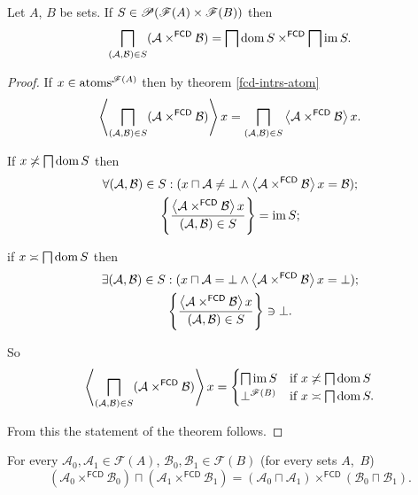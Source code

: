 \begin{thm}
\label{meet-prod-fcd}Let $A$, $B$ be sets. If
$S\in\mathscr{P}(\mathscr{F}(A)\times\mathscr{F}(B))$
then
\[
\bigsqcap_{(\mathcal{A},\mathcal{B})\in
S}(\mathcal{A}\times^{\mathsf{FCD}}\mathcal{B})=\bigsqcap\operatorname{dom}
S\times^{\mathsf{FCD}}\bigsqcap\operatorname{im} S.
\]
\end{thm}
\begin{proof}
If $x\in\operatorname{atoms}^{\mathscr{F}(A)}$ then by theorem \ref{fcd-intrs-atom}
\[
\left\langle \bigsqcap_{(\mathcal{A},\mathcal{B})\in
S}(\mathcal{A}\times^{\mathsf{FCD}}\mathcal{B})\right\rangle x=\bigsqcap_{(\mathcal{A}
,\mathcal{B})\in S}\left\langle \mathcal{A}\times^{\mathsf{FCD}}\mathcal{B}\right\rangle x.
\]


If $x\not\asymp\bigsqcap\operatorname{dom} S$ then
\begin{gather*}
\forall(\mathcal{A},\mathcal{B})\in
S:(x\sqcap\mathcal{A}\ne\bot\land\left\langle \mathcal{A}\times^{
\mathsf{FCD}}\mathcal{B}\right\rangle x=\mathcal{B});\\
\left\{ \frac{\left\langle \mathcal{A}\times^{\mathsf{FCD}}\mathcal{B}\right\rangle x}{(\mathcal{A}
,\mathcal{B})\in S}\right\}=\operatorname{im} S;
\end{gather*}


if $x\asymp\bigsqcap\operatorname{dom} S$ then
\begin{gather*}
\exists(\mathcal{A},\mathcal{B})\in
S:(x\sqcap\mathcal{A}=\bot\land\left\langle \mathcal{A}\times^{
\mathsf{FCD}}\mathcal{B}\right\rangle x=\bot);\\
\left\{ \frac{\left\langle \mathcal{A}\times^{\mathsf{FCD}}\mathcal{B}\right\rangle x}{(\mathcal{A}
,\mathcal{B})\in S}\right\}\ni\bot.
\end{gather*}


So
\[
\left\langle \bigsqcap_{(\mathcal{A},\mathcal{B})\in
S}(\mathcal{A}\times^{\mathsf{FCD}}\mathcal{B})\right\rangle x=\begin{cases}
\bigsqcap\operatorname{im} S & \text{if }x\not\asymp\bigsqcap\operatorname{dom} S\\
\bot^{\mathscr{F}(B)} & \text{if }x\asymp\bigsqcap\operatorname{dom} S.
\end{cases}
\]


From this the statement of the theorem follows.\end{proof}
\begin{cor}
For every $\mathcal{A}_{0},\mathcal{A}_{1}\in\mathscr{F}(A)$,
$\mathcal{B}_{0},\mathcal{B}_{1}\in\mathscr{F}(B)$
(for every sets $A$,~$B$)
\[
(\mathcal{A}_{0}\times^{\mathsf{FCD}}\mathcal{B}_{0})\sqcap(\mathcal{A}_{1}
\times^{\mathsf{FCD}}\mathcal{B}_{1})=(\mathcal{A}_{0}\sqcap\mathcal{A}_{1}
)\times^{\mathsf{FCD}}(\mathcal{B}_{0}\sqcap\mathcal{B}_{1}).
\]
\end{cor}
